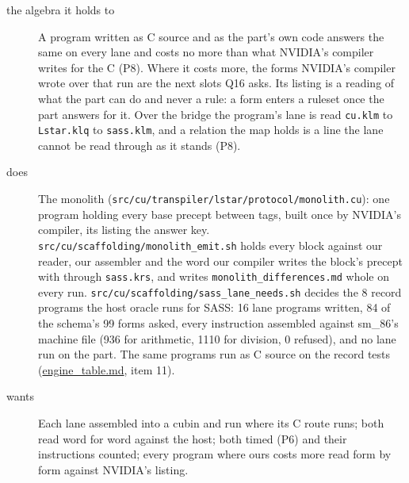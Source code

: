 \begin{description}
\item[{the algebra it holds to}] A program written as C source and as the part's own code answers the same on every lane and costs no more than what NVIDIA's compiler writes for the C (P8). Where it costs more, the forms NVIDIA's compiler wrote over that run are the next slots Q16 asks. Its listing is a reading of what the part can do and never a rule: a form enters a ruleset once the part answers for it. Over the bridge the program's lane is read \texttt{cu.\allowbreak{}klm} to \texttt{Lstar.\allowbreak{}klq} to \texttt{sass.\allowbreak{}klm}, and a relation the map holds is a line the lane cannot be read through as it stands (P8).
\item[{does}] The monolith (\texttt{src/\allowbreak{}cu/\allowbreak{}transpiler/\allowbreak{}lstar/\allowbreak{}protocol/\allowbreak{}monolith.\allowbreak{}cu}): one program holding every base precept between tags, built once by NVIDIA's compiler, its listing the answer key. \texttt{src/\allowbreak{}cu/\allowbreak{}scaffolding/\allowbreak{}monolith\_\allowbreak{}emit.\allowbreak{}sh} holds every block against our reader, our assembler and the word our compiler writes the block's precept with through \texttt{sass.\allowbreak{}krs}, and writes \texttt{monolith\_\allowbreak{}differences.\allowbreak{}md} whole on every run. \texttt{src/\allowbreak{}cu/\allowbreak{}scaffolding/\allowbreak{}sass\_\allowbreak{}lane\_\allowbreak{}needs.\allowbreak{}sh} decides the 8 record programs the host oracle runs for SASS: 16 lane programs written, 84 of the schema's 99 forms asked, every instruction assembled against sm\_\allowbreak{}86's machine file (936 for arithmetic, 1110 for division, 0 refused), and no lane run on the part. The same programs run as C source on the record tests (\hyperref[chap:engine-table]{engine\_\allowbreak{}table.md}, item 11).
\item[{wants}] Each lane assembled into a cubin and run where its C route runs; both read word for word against the host; both timed (P6) and their instructions counted; every program where ours costs more read form by form against NVIDIA's listing.

\end{description}
